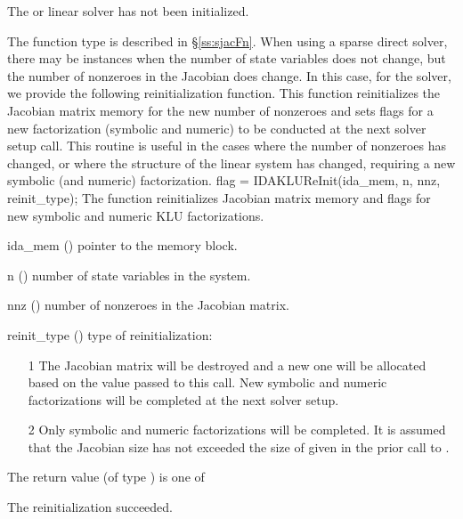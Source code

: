 {{\begin{args}
    The {\idaklu} or {\idasuperlumt} linear solver has not been initialized.
  \end{args}
}
{
  The function type  is described in \S\ref{ss:sjacFn}.
}
When using a sparse direct solver, there 
may be instances when the number of state variables does not 
change, but the number of nonzeroes in the Jacobian does change.  
In this case, for the {\cvklu} solver, we provide the following reinitialization
function.  This function reinitializes the Jacobian matrix
memory for the new number of nonzeroes and sets flags for a new factorization 
(symbolic and numeric) to be conducted at the next solver setup
call.  This routine is useful in the cases where the number of nonzeroes 
has changed, or where the structure of the linear system has changed,
requiring a new symbolic (and numeric) factorization.
{
  flag = IDAKLUReInit(ida\_mem, n, nnz, reinit\_type);
}
{
  The function  reinitializes Jacobian matrix memory and flags for
  new symbolic and numeric KLU factorizations.
}
{
  \begin{args}
  \item[ida\_mem] ()
    pointer to the {\ida} memory block.
  \item[n] ()
    number of state variables in the system.
  \item[nnz] ()
    number of nonzeroes in the Jacobian matrix.
  \item[reinit\_type] ()
    type of reinitialization:
    \begin{itemize}
    \item[1]  The Jacobian matrix will be destroyed and a new one will 
      be allocated based on the  value passed to this call. New symbolic and
      numeric factorizations will be completed at the next
      solver setup.
    \item[2]  Only symbolic and numeric factorizations will be completed.  
      It is assumed that the Jacobian size has not exceeded the size of 
       given in the prior call to {\idaklu}.
    \end{itemize}
  \end{args}
}
{
  The return value  (of type ) is one of
  \begin{args}
  \item[\Id{IDASLS\_SUCCESS}] 
    The reinitialization succeeded.
  \item[\Id{IDASLS\_MEM\_NULL}]

\end{args}}}
